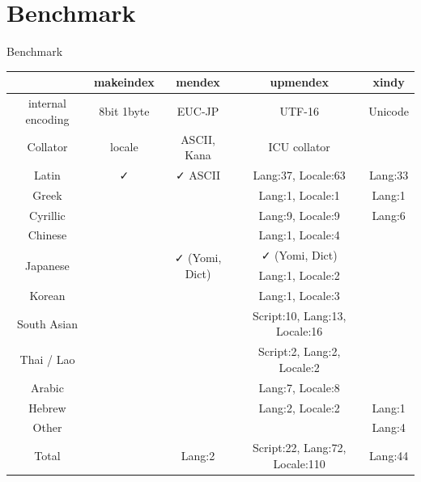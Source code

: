 \documentclass[aspectratio=169,10pt]{beamer}
\begin{document}

\section{Benchmark}
\begin{frame}{Benchmark}

\begin{center}
\footnotesize
\begin{tabular}{c|c|c|c|c}
            & makeindex & mendex      & upmendex            & xindy   \\\hline\hline
internal encoding & 8bit 1byte & EUC-JP    & UTF-16         & Unicode \\
Collator    & locale    & ASCII, Kana & ICU collator        &         \\\hline
Latin       & ✓        & ✓ ASCII    & Lang:37, Locale:63  & Lang:33 \\
Greek       &           &             & Lang:1, Locale:1    & Lang:1 \\
Cyrillic    &           &             & Lang:9, Locale:9    & Lang:6 \\\hdashline
Chinese     &           &             & Lang:1, Locale:4    &  \\
\multirow{2}{*}{Japanese} & & \multirow{2}{*}{✓ (Yomi, Dict)} & ✓ (Yomi, Dict) & \\
            &           &             & Lang:1, Locale:2    & \\
Korean      &           &             & Lang:1, Locale:3    & \\\hdashline
South Asian &           &   & Script:10, Lang:13, Locale:16 & \\
Thai / Lao  &           &   & Script:2, Lang:2, Locale:2    & \\
Arabic      &           &             & Lang:7, Locale:8    & \\
Hebrew      &           &             & Lang:2, Locale:2    & Lang:1  \\\hdashline
Other       &           &             &                     & Lang:4  \\\hline
Total       &           & Lang:2      & Script:22, Lang:72, Locale:110  & Lang:44 \\
\end{tabular}
\end{center}

\end{frame}

\end{document}
